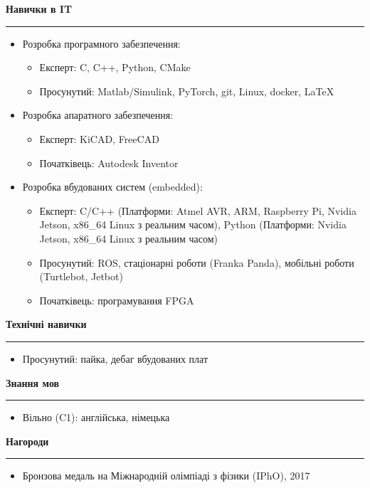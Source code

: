 \documentclass[12pt]{article} %
\newcommand{\HighlightedText}[1] {{\textbf{#1}}}
\newenvironment{ItemizeSection}[1]{
    \vspace{1mm}
    \HighlightedText{#1}
    \vspace{0.5mm}
    {\color{custom_blue} \hrule}
    \begin{itemize}[left=0.5em, topsep=0pt, itemsep=0pt, label={$\bullet$}]
}{
    \end{itemize}
}
\newenvironment{ItemizeSubsection}{
    \begin{itemize}[left=0.5em, topsep=-999pt, itemsep=0pt, label={$\circ$}]
}{
    \end{itemize}
}
\begin{document}
\newpage
\begin{ItemizeSection}{Навички в IT}
    \item Розробка програмного забезпечення:
    \begin{ItemizeSubsection}
        \item Експерт: C, C++, Python, CMake
        \item Просунутий: Matlab/Simulink, PyTorch, git, Linux, docker, \LaTeX
    \end{ItemizeSubsection}
    \item Розробка апаратного забезпечення:
    \begin{ItemizeSubsection}
        \item Експерт: KiCAD, FreeCAD
        \item Початківець: Autodesk Inventor
    \end{ItemizeSubsection}
    \item Розробка вбудованих систем (embedded):
    \begin{ItemizeSubsection}
        \item Експерт: C/C++ (Платформи: Atmel AVR, ARM, Raspberry Pi, Nvidia Jetson, x86\_64 Linux з реальним часом), Python (Платформи: Nvidia Jetson, x86\_64 Linux з реальним часом)
        \item Просунутий: ROS, стаціонарні роботи (Franka Panda), мобільні роботи (Turtlebot, Jetbot)
        \item Початківець: програмування FPGA
    \end{ItemizeSubsection}
\end{ItemizeSection}



\begin{ItemizeSection}{Технічні навички}
    \item Просунутий: пайка, дебаг вбудованих плат
\end{ItemizeSection}

\begin{ItemizeSection}{Знання мов}
    \item Вільно (C1): англійська, німецька
\end{ItemizeSection}

\begin{ItemizeSection}{Нагороди}
    \item Бронзова медаль на Міжнародній олімпіаді з фізики (IPhO), 2017
\end{ItemizeSection}
\end{document}
